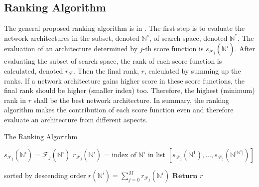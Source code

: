 \documentclass[sigconf]{acmart}
\begin{document}
    \subsection{Ranking Algorithm}

    The general proposed ranking algorithm is in . 
    The first step is to evaluate the network architectures in the subset, 
    denoted $\mathbb N^s$, of search space, denoted $\mathbb N^*$. The 
    evaluation of an architecture determined by $j$-th score function 
    is $s_{\mathcal F_j}(\mathbb N^i)$. After evaluating the subset 
    of search space, the rank of each score function is calculated, denoted 
    $r_{\mathcal F}$. Then the final rank, $r$, calculated by summing up 
    the ranks. If a network architecture gains higher score in these score 
    functions, the final rank should be higher (smaller index) too. Therefore, 
    the highest (minimum) rank in $r$ shall be the best network architecture. 
    In summary, the ranking algorithm makes the contribution of 
    each score function even and therefore evaluate an architecture from 
    different aspects. 

    \begin{algorithm}[h]
        \caption{The Ranking Algorithm}\label{alg:rank-based}
        \begin{algorithmic}[1]
                    \State $s_{{\mathcal F}_{j}}({\mathbb N}^i)={\mathcal F}_{j}({\mathbb N}^i)$
                \EndFor
            \EndFor
                \State $r_{{\mathcal F}_{j}}({\mathbb N}^i)$ = index of ${\mathbb N}^i$ in list $[s_{{\mathcal F}_{j}}({\mathbb N}^1),\ldots,s_{{\mathcal F}_{j}}({\mathbb N}^{\lvert {\mathbb N}^s\rvert})]$ \par sorted by descending order
            \EndFor
            \State $r({\mathbb N}^i)=\sum^M_{j=0} r_{{\mathcal F}_{j}}({\mathbb N}^i)$
            \State $\textbf{Return }r$
        \end{algorithmic}
    \end{algorithm}
\end{document}
